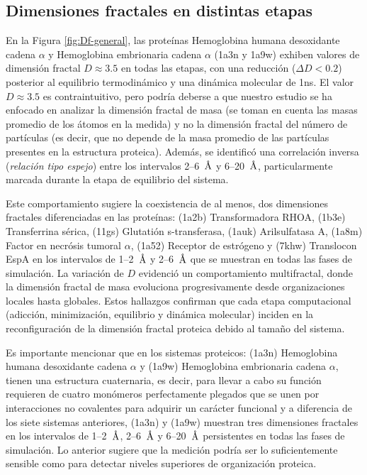 	

	\subsection{Dimensiones fractales en distintas etapas}	
	\label{subsec:DFE}
	
	En la Figura \ref{fig:Df-general}, las prote\'{i}nas Hemoglobina humana desoxidante cadena $\alpha$ y Hemoglobina embrionaria cadena $\alpha$ (1a3n y 1a9w) exhiben valores de dimensi\'{o}n fractal $D \approx 3.5$ en todas las etapas, con una reducci\'{o}n  ($\Delta D < 0.2$) posterior al equilibrio termodin\'{a}mico y una din\'{a}mica molecular de 1ns. El valor $D \approx 3.5$  es contraintuitivo, pero podr\'{i}a deberse a que nuestro estudio se ha enfocado en analizar la dimensi\'{o}n fractal de masa (se toman en cuenta las masas promedio de los \'{a}tomos en la medida) y no la dimensi\'{o}n fractal del n\'{u}mero de part\'{i}culas (es decir, que no depende de la masa promedio de las part\'{i}culas presentes en la estructura proteica). Adem\'{a}s, se identific\'{o} una correlaci\'{o}n inversa (\emph{relaci\'{o}n tipo espejo}) entre los intervalos 2--6~$\textup{\r{A}}$ y 6--20~$\textup{\r{A}}$, particularmente marcada durante la etapa de equilibrio del sistema. 
	
	Este comportamiento sugiere la coexistencia de al menos, dos dimensiones fractales diferenciadas en las prote\'{i}nas: (1a2b) Transformadora RHOA, (1b3e) Transferrina s\'{e}rica, (11gs) Glutati\'{o}n s-transferasa, (1auk) Arilsulfatasa A, (1a8m) Factor en necr\'{o}sis tumoral $\alpha$, (1a52) Receptor de estr\'{o}geno y (7khw) Translocon EspA en los intervalos de 1--2~$\textup{\r{A}}$ y 2--6~$\textup{\r{A}}$ que se muestran en todas las fases de simulaci\'{o}n. La variaci\'{o}n de $D$ evidenció un comportamiento multifractal, donde la dimensi\'{o}n fractal de masa evoluciona progresivamente desde organizaciones locales hasta globales. Estos hallazgos confirman que cada etapa computacional (adicci\'{o}n, minimizaci\'{o}n, equilibrio y din\'{a}mica molecular) inciden en la reconfiguraci\'{o}n de la dimensi\'{o}n fractal proteica debido al tamaño del sistema.
	
	Es importante mencionar que en los sistemas proteicos: (1a3n) Hemoglobina humana desoxidante cadena $\alpha$ y (1a9w) Hemoglobina embrionaria cadena $\alpha$, tienen una estructura cuaternaria, es decir, para llevar a cabo su funci\'{o}n requieren de cuatro mon\'{o}meros perfectamente plegados que se unen por interacciones no covalentes para adquirir un car\'{a}cter funcional y a diferencia de los siete sistemas anteriores, (1a3n) y (1a9w) muestran tres dimensiones fractales en los intervalos de 1--2~$\textup{\r{A}}$, 2--6~$\textup{\r{A}}$ y 6--20~$\textup{\r{A}}$ persistentes en todas las fases de simulaci\'{o}n. Lo anterior sugiere que la medici\'{o}n podr\'{i}a ser lo suficientemente sensible como para detectar niveles superiores de organizaci\'{o}n proteica.
	
